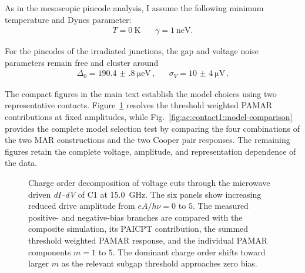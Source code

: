         As in the mesoscopic pincode analysis, I assume the following minimum temperature and Dynes parameter:
        \begin{align}
            T = \qty{0}{\kelvin}\, &&
            \gamma = \qty{1}{\nano\electronvolt}.
            \label{eq:ac:photon-assisted-transport:assumptions}
        \end{align}

        For the pincodes of the irradiated junctions, the gap and voltage noise parameters remain free and cluster around
        \begin{align}
            \Delta_0 = \qty{190.4(8)}{\micro\electronvolt}\,, &&
            \sigma_V = \qty{10(4)}{\micro\volt}\,.
            \label{eq:ac:photon-assisted-transport:parameter}
        \end{align}

        The compact figures in the main text establish the model choices using two representative contacts. Figure~\ref{fig:ac:contact1:voltage-cuts} resolves the threshold weighted PAMAR contributions at fixed amplitudes, while Fig.~\ref{fig:ac:contact1:model-comparison} provides the complete model selection test by comparing the four combinations of the two MAR constructions and the two Cooper pair responses. The remaining figures retain the complete voltage, amplitude, and representation dependence of the data.

        \begin{figure}[t]
            \centering
            \caption{Charge order decomposition of voltage cuts through the microwave driven \textit{dI--dV} of C1 at \qty{15.0}{\giga\hertz}. The six panels show increasing reduced drive amplitude from $eA/h\nu=0$ to $5$. The measured positive- and negative-bias branches are compared with the composite simulation, its PAICPT contribution, the summed threshold weighted PAMAR response, and the individual PAMAR components $m=1$ to $5$. The dominant charge order shifts toward larger $m$ as the relevant subgap threshold approaches zero bias.}
            \label{fig:ac:contact1:voltage-cuts}
        \end{figure}

